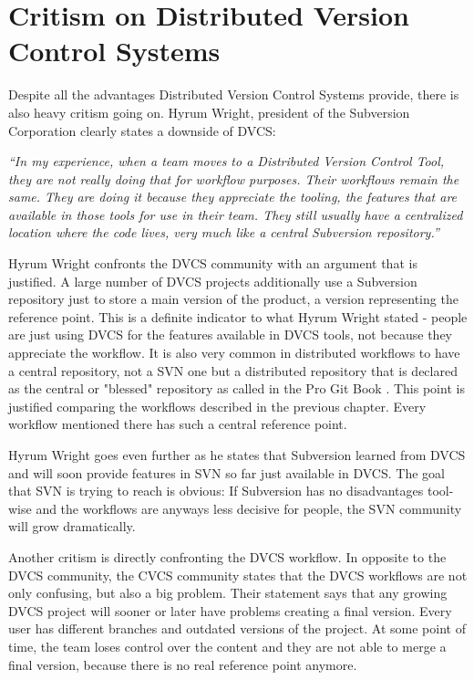 \section{Critism on Distributed Version Control Systems}\label{critismondvcs}

Despite all the advantages Distributed Version Control Systems provide, there is also heavy critism going on. Hyrum Wright, president of the Subversion Corporation clearly states a downside of DVCS: 

\textit{"`In my experience, when a team moves to a Distributed Version Control Tool, they are not really doing that for workflow purposes. Their workflows remain the same. They are doing it because they appreciate the tooling, the features that are available in those tools for use in their team. They still usually have a centralized location where the code lives, very much like a central Subversion repository."'} \cite{subversionandgit}

Hyrum Wright confronts the DVCS community with an argument that is justified. A large number of DVCS projects additionally use a Subversion repository just to store a main version of the product, a version representing the reference point. This is a definite indicator to what Hyrum Wright stated - people are just using DVCS for the features available in DVCS tools, not because they appreciate the workflow. It is also very common in distributed workflows to have a central repository, not a SVN one but a distributed repository that is declared as the central or "blessed" repository as called in the Pro Git Book \cite[Chapter 5.1]{gitpro2009}. This point is justified comparing the workflows described in the previous chapter. Every workflow mentioned there has such a central reference point.

Hyrum Wright goes even further as he states that Subversion learned from DVCS and will soon provide features in SVN so far just available in DVCS. \cite{subversionandgit} The goal that SVN is trying to reach is obvious: If Subversion has no disadvantages tool-wise and the workflows are anyways less decisive for people, the SVN community will grow dramatically.

Another critism is directly confronting the DVCS workflow. In opposite to the DVCS community, the CVCS community states that the DVCS workflows are not only confusing, but also a big problem. Their statement says that any growing DVCS project will sooner or later have problems creating a final version. Every user has different branches and outdated versions of the project. At some point of time, the team loses control over the content and they are not able to merge a final version, because there is no real reference point anymore. 
